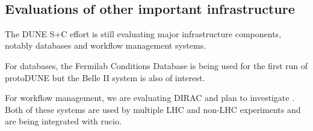 \begin{verbatim}
    

\end{verbatim}




\subsection{Evaluations of other important infrastructure}

The DUNE S+C effort is still evaluating major infrastructure components, notably databases and workflow management systems.

For databases, the Fermilab Conditions Database is being used for the first run of protoDUNE but the Belle II\cite{https://docs.belle2.org/record/1192} system is also of interest. 

For workflow management, we are evaluating DIRAC \cite{DIRAC} and plan to investigate \cite{PandA}. Both of these systems are used by multiple LHC and non-LHC experiments and are being integrated with rucio. 

\begin{verbatim}
\end{verbatim}







